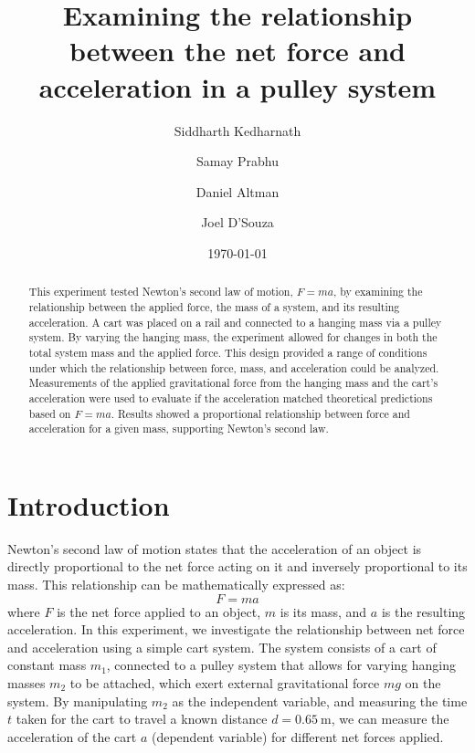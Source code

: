 ﻿\documentclass[reprint,amsmath,amssymb,aps,twoside]{revtex4-2}
\begin{document}
\setcounter{page}{17}
\title{Examining the relationship between the net force and acceleration in a pulley system}
\author{Siddharth Kedharnath}
\author{Samay Prabhu}
\author{Daniel Altman}
\author{Joel D'Souza}
\date{\today}

\begin{abstract}
This experiment tested Newton’s second law of motion, $F=ma$, by examining the relationship between the applied force, the mass of a system, and its resulting acceleration. A cart was placed on a rail and connected to a hanging mass via a pulley system. By varying the hanging mass, the experiment allowed for changes in both the total system mass and the applied force. This design provided a range of conditions under which the relationship between force, mass, and acceleration could be analyzed. Measurements of the applied gravitational force from the hanging mass and the cart's acceleration were used to evaluate if the acceleration matched theoretical predictions based on $F=ma$. Results showed a proportional relationship between force and acceleration for a given mass, supporting Newton’s second law.
\end{abstract}


\maketitle\thispagestyle{mytitlepage}







\section{Introduction}
Newton's second law of motion\cite{tipler} states that the acceleration of an object is directly proportional to the net force acting on it and inversely proportional to its mass. This relationship can be mathematically expressed as:
\begin{equation}
F = ma
\end{equation}
where $F$ is the net force applied to an object, $m$ is its mass, and $a$ is the resulting acceleration.  In this experiment, we investigate the relationship between net force and acceleration using a simple cart system. The system consists of a cart of constant mass $m_1$, connected to a pulley system that allows for varying hanging masses $m_2$ to be attached, which exert external gravitational force $mg$ on the system. By manipulating $m_2$ as the independent variable, and measuring the time $t$ taken for the cart to travel a known distance $d=\qty{0.65}{\meter}$, we can measure the acceleration of the cart $a$ (dependent variable) for different net forces applied. 
\end{document}
